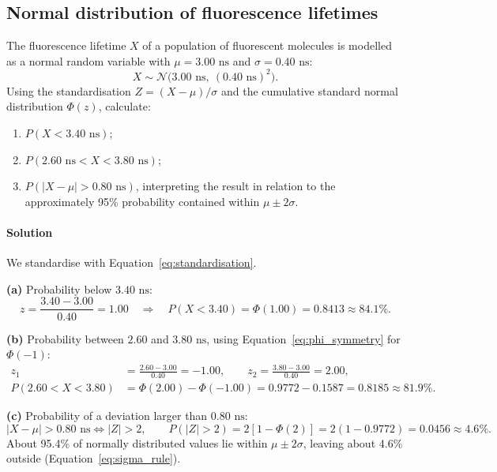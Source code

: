 \subsection{Normal distribution of fluorescence lifetimes}
\label{ex:lifetime_normal}

The fluorescence lifetime $X$ of a population of fluorescent molecules is modelled as a normal random variable with $\mu = 3.00\text{ ns}$ and $\sigma = 0.40\text{ ns}$:
\begin{equation*}
X \sim \mathcal{N}\big(3.00\text{ ns},\ (0.40\text{ ns})^2\big).
\end{equation*}
Using the standardisation $Z = (X - \mu)/\sigma$ and the cumulative standard normal distribution $\Phi(z)$, calculate:
\begin{enumerate}[label=(\alph*)]
    \item $P(X < 3.40\text{ ns})$;
    \item $P(2.60\text{ ns} < X < 3.80\text{ ns})$;
    \item $P(|X - \mu| > 0.80\text{ ns})$, interpreting the result in relation to the approximately 95\% probability contained within $\mu \pm 2\sigma$.
\end{enumerate}

\paragraph{Solution} We standardise with Equation~\eqref{eq:standardisation}.

\textbf{(a)} Probability below $3.40\text{ ns}$:
\begin{equation*}
z = \frac{3.40 - 3.00}{0.40} = 1.00 \quad \Longrightarrow \quad P(X < 3.40) = \Phi(1.00) = 0.8413 \approx 84.1\%.
\end{equation*}

\textbf{(b)} Probability between $2.60$ and $3.80\text{ ns}$, using Equation~\eqref{eq:phi_symmetry} for $\Phi(-1)$:
\begin{align*}
z_1 &= \frac{2.60 - 3.00}{0.40} = -1.00, \qquad z_2 = \frac{3.80 - 3.00}{0.40} = 2.00, \\[1ex]
P(2.60 < X < 3.80) &= \Phi(2.00) - \Phi(-1.00) = 0.9772 - 0.1587 = 0.8185 \approx 81.9\%.
\end{align*}

\textbf{(c)} Probability of a deviation larger than $0.80\text{ ns}$:
\begin{equation*}
|X - \mu| > 0.80\text{ ns} \iff |Z| > 2, \qquad P(|Z| > 2) = 2\left[1 - \Phi(2)\right] = 2(1 - 0.9772) = 0.0456 \approx 4.6\%.
\end{equation*}
About 95.4\% of normally distributed values lie within $\mu \pm 2\sigma$, leaving about 4.6\% outside (Equation~\eqref{eq:sigma_rule}).


